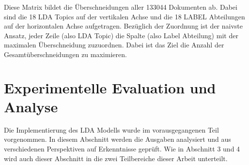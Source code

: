 \documentclass[german,version-2020-11]{uzl-thesis}
\begin{document}

Diese Matrix bildet die Überschneidungen aller 133044 Dokumenten ab. Dabei sind die 18 LDA Topics auf der vertikalen Achse und die 18 LABEL Abteilungen auf der horizontalen Achse aufgetragen. Bezüglich der Zuordnung ist der naivste Ansatz, jeder Zeile (also LDA Topic) die Spalte (also Label Abteilung) mit der maximalen Überschneidung zuzuordnen. Dabei ist das Ziel die Anzahl der Gesamtüberschneidungen zu maximieren. \\



	
\chapter{Experimentelle Evaluation und Analyse}%
Die Implementierung des LDA Modells wurde im vorausgegangenen Teil vorgenommen. In diesem Abschnitt werden die Ausgaben analysiert und aus verschiedenen Perspektiven auf Erkenntnisse geprüft. Wie in Abschnitt 3 und 4 wird auch dieser Abschnitt in die zwei Teilbereiche dieser Arbeit unterteilt.\\
\end{document}
